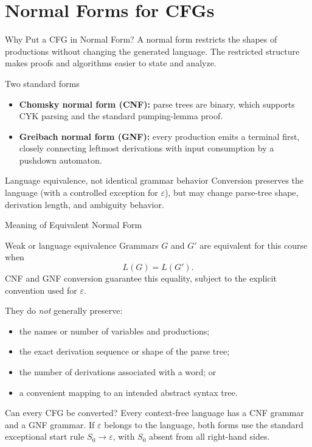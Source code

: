 \documentclass[10pt]{beamer}
\begin{document}
\section{Normal Forms for CFGs}

\begin{frame}{Why Put a CFG in Normal Form?}
  \small
  A normal form restricts the shapes of productions without changing the
  generated language. The restricted structure makes proofs and algorithms
  easier to state and analyze.
  \begin{block}{Two standard forms}
    \begin{itemize}
      \item \textbf{Chomsky normal form (CNF):} parse trees are binary, which
        supports CYK parsing and the standard pumping-lemma proof.
      \item \textbf{Greibach normal form (GNF):} every production emits a
        terminal first, closely connecting leftmost derivations with input
        consumption by a pushdown automaton.
    \end{itemize}
  \end{block}
  \pause
  \begin{alertblock}{Language equivalence, not identical grammar behavior}
    Conversion preserves the language (with a controlled exception for
    $\varepsilon$), but may change parse-tree shape, derivation length, and
    ambiguity behavior.
  \end{alertblock}
\end{frame}

\begin{frame}{Meaning of Equivalent Normal Form}
  \small
  \begin{block}{Weak or language equivalence}
    Grammars $G$ and $G'$ are equivalent for this course when
    \[
      L(G)=L(G').
    \]
    CNF and GNF conversion guarantee this equality, subject to the explicit
    convention used for $\varepsilon$.
  \end{block}
  They do \emph{not} generally preserve:
  \begin{itemize}
    \item the names or number of variables and productions;
    \item the exact derivation sequence or shape of the parse tree;
    \item the number of derivations associated with a word; or
    \item a convenient mapping to an intended abstract syntax tree.
  \end{itemize}
  \begin{alertblock}{Can every CFG be converted?}
    Every context-free language has a CNF grammar and a GNF grammar. If
    $\varepsilon$ belongs to the language, both forms use the standard
    exceptional start rule $S_0\to\varepsilon$, with $S_0$ absent from all
    right-hand sides.
  \end{alertblock}
\end{frame}
\end{document}
